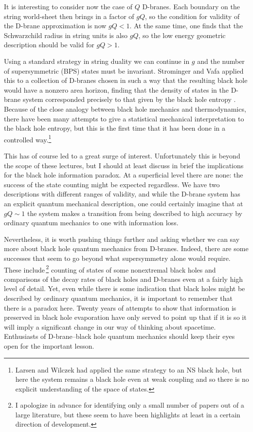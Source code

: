 \documentclass[12pt]{article}
\begin{document}
It is interesting to consider now the case of $Q$ D-branes.  Each boundary on
the string world-sheet then brings in a factor of $gQ$, so the condition for
validity of the D-brane approximation is now $gQ < 1$.  At the same time, one
finds that the Schwarzchild radius in string units is also $gQ$, so the
low energy geometric description should be valid for $gQ > 1$.

Using a standard strategy in string duality we can continue in $g$ and the
number of supersymmetric (BPS) states must be invariant.  Strominger and Vafa
applied this to a collection of D-branes chosen in such a way that the
resulting black hole would have a nonzero area horizon, finding that the
density of states in the D-brane system corresponded precisely to that given
by the black hole entropy \cite{sv}.  Because of the close analogy between
black hole mechanics and thermodynamics, there have been many attempts to
give a statistical mechanical interpretation to the black hole entropy, but
this is the first time that it has been done in a controlled way.\footnote
{Larsen and Wilczek \cite{larwil} had applied the same strategy to an NS black
hole, but here the system remains a black hole even at weak coupling and so
there is no explicit understanding of the space of states.}

This has of course led to a great surge of interest.  Unfortunately this
is beyond the scope of these lectures, but I should at least discuss in brief
the implications for the black hole information paradox.  At a superficial
level there are none: the success of the state counting might be expected
regardless.  We have two descriptions with different ranges of validity, and
while the D-brane system has an explicit quantum mechanical description, one
could certainly imagine that at
$gQ \sim 1$ the system makes a transition from being described to high accuracy
by ordinary quantum mechanics to one with information loss.

Nevertheless, it
is worth pushing things further and asking whether we can say more about black
hole quantum mechanics from D-branes.  Indeed, there are some successes that
seem to go beyond what supersymmetry alone would require.  These
include\,\footnote
{I apologize in advance for identifying only a small number of papers out of
a large literature, but these seem to have been highlights at least in a
certain direction of development.} counting of states of some nonextremal
black holes \cite{nonex} and comparisons of the decay rates of black holes and
D-branes \cite{decay} even at a fairly high level of detail. \cite{grey} 
Yet, even while there is some indication that black holes might be described by
ordinary quantum mechanics, it is important to remember that there is a paradox
here.  Twenty years of attempts to show that information is preserved in black
hole evaporation have only served to point up that if it is so it will imply
a significant change in our way of thinking about spacetime.  Enthusiasts of
D-brane--black hole quantum mechanics should keep their eyes open for the
important lesson.
\end{document}
